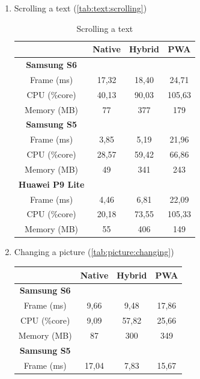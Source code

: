 \begin{enumerate} [ref={Scenario}\xspace\arabic*]
    \item \label{scenario:text:scrolling} Scrolling a text (\autoref{tab:text:scrolling})
    \begin{table}[]
        \centering
        \begin{tabular}{|c|c|c|c|}
            \hline
             & Native & Hybrid & PWA \\
             \hline
            \textbf{Samsung S6} &   &   &   \\
            Frame (ms) & 17,32 & 18,40 & 24,71 \\
            CPU (\%core) & 40,13 & 90,03 & 105,63 \\
            Memory (MB) & 77 & 377 & 179 \\
            \hline   
            \textbf{Samsung S5} &   &   &   \\
            Frame (ms) & 3,85 & 5,19 & 21,96 \\
            CPU (\%core) & 28,57 & 59,42 & 66,86 \\
            Memory (MB) & 49 & 341 & 243 \\
            \hline
            \textbf{Huawei P9 Lite} &   &   &   \\
            Frame (ms) & 4,46 & 6,81 & 22,09 \\
            CPU (\%core) & 20,18 & 73,55 & 105,33 \\
            Memory (MB) & 55 & 406 & 149 \\
            \hline
        \end{tabular}
        \caption{Scrolling a text}
        \label{tab:text:scrolling}
    \end{table}
    \item \label{scenario:picture:changing} Changing a picture (\autoref{tab:picture:changing})
    \begin{table}[]
        \centering
        \begin{tabular}{|c|c|c|c|}
            \hline
             & Native & Hybrid & PWA \\
             \hline
            \textbf{Samsung S6} &   &   &   \\
            Frame (ms) & 9,66 & 9,48 & 17,86 \\
            CPU (\%core) & 9,09 & 57,82 & 25,66 \\
            Memory (MB) & 87 & 300 & 349 \\
            \hline   
            \textbf{Samsung S5} &   &   &   \\
            Frame (ms) & 17,04 & 7,83 & 15,67 \\

\end{tabular}
\end{table}
\end{enumerate}

